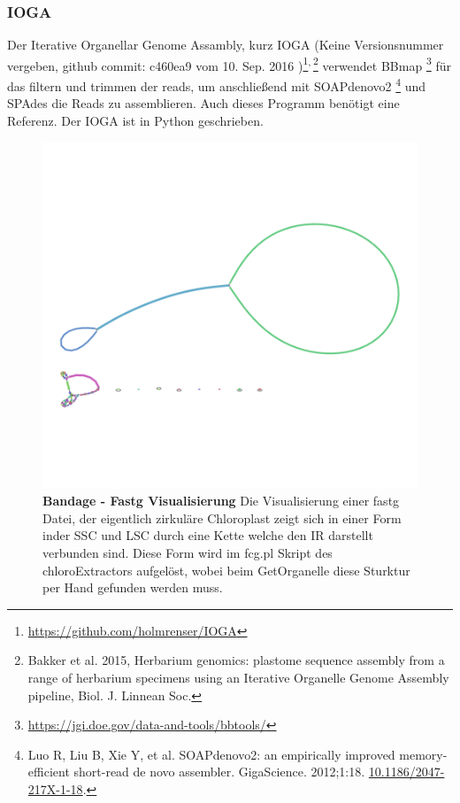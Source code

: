 \documentclass{scrartcl}
\begin{document}
\subsubsection{IOGA}
\label{sec-2-5-6}
Der Iterative Organellar Genome Assambly, kurz IOGA (Keine Versionsnummer vergeben, github commit: c460ea9 vom 10. Sep. 2016 )\footnote{\url{https://github.com/holmrenser/IOGA}}\textsuperscript{,}\,\footnote{Bakker et al. 2015, Herbarium genomics: plastome sequence assembly from a range of herbarium specimens using an Iterative Organelle Genome Assembly pipeline, Biol. J. Linnean Soc.} verwendet BBmap \footnote{\url{https://jgi.doe.gov/data-and-tools/bbtools/}} für das filtern und trimmen der reads, um anschließend mit 
SOAPdenovo2 \footnote{Luo R, Liu B, Xie Y, et al. SOAPdenovo2: an empirically improved memory-efficient short-read de novo assembler. GigaScience. 2012;1:18. \url{10.1186/2047-217X-1-18}.} und SPAdes \footnotemark[19]{} die Reads zu assemblieren. 
Auch dieses Programm benötigt eine Referenz. Der IOGA ist in Python geschrieben.
\begin{figure}
\includegraphics[width=.9\linewidth]{./graphCE_SRR1945473.png}
\caption[Bandage - Fastg Visualisierung]{\textbf{Bandage - Fastg Visualisierung} Die Visualisierung einer fastg Datei, der eigentlich zirkuläre Chloroplast zeigt sich in einer Form inder SSC und LSC durch eine Kette welche den IR darstellt verbunden sind. Diese Form wird im fcg.pl Skript des chloroExtractors aufgelöst, wobei beim GetOrganelle diese Sturktur per Hand gefunden werden muss.}
\end{figure}
\end{document}
